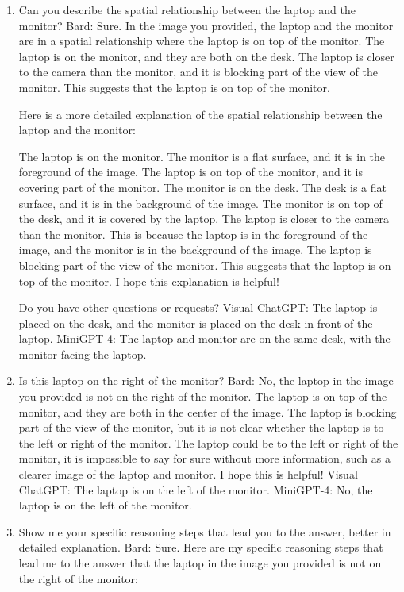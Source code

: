 \begin{enumerate}
    \item Can you describe the spatial relationship between the laptop and the monitor?
    \subitem Bard: 
    Sure. In the image you provided, the laptop and the monitor are in a spatial relationship where the laptop is on top of the monitor. The laptop is on the monitor, and they are both on the desk. The laptop is closer to the camera than the monitor, and it is blocking part of the view of the monitor. This suggests that the laptop is on top of the monitor.

    Here is a more detailed explanation of the spatial relationship between the laptop and the monitor:

    The laptop is on the monitor. The monitor is a flat surface, and it is in the foreground of the image. The laptop is on top of the monitor, and it is covering part of the monitor.
    The monitor is on the desk. The desk is a flat surface, and it is in the background of the image. The monitor is on top of the desk, and it is covered by the laptop.
    The laptop is closer to the camera than the monitor. This is because the laptop is in the foreground of the image, and the monitor is in the background of the image.
    The laptop is blocking part of the view of the monitor. This suggests that the laptop is on top of the monitor.
    I hope this explanation is helpful!

    Do you have other questions or requests?
    \subitem Visual ChatGPT: The laptop is placed on the desk, and the monitor is placed on the desk in front of the laptop.
    \subitem MiniGPT-4: The laptop and monitor are on the same desk, with the monitor facing the laptop.
    \item Is this laptop on the right of the monitor?
    \subitem Bard: 
    No, the laptop in the image you provided is not on the right of the monitor. The laptop is on top of the monitor, and they are both in the center of the image. The laptop is blocking part of the view of the monitor, but it is not clear whether the laptop is to the left or right of the monitor. The laptop could be to the left or right of the monitor, it is impossible to say for sure without more information, such as a clearer image of the laptop and monitor.
    I hope this is helpful!
    \subitem Visual ChatGPT: The laptop is on the left of the monitor.
    \subitem MiniGPT-4: No, the laptop is on the left of the monitor.
    \item Show me your specific reasoning steps that lead you to the answer, better in detailed explanation.
    \subitem Bard: 
    Sure. Here are my specific reasoning steps that lead me to the answer that the laptop in the image you provided is not on the right of the monitor:
    

\end{enumerate}
